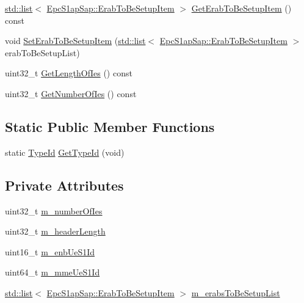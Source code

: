 \begin{DoxyCompactItemize}
\item 
\hyperlink{openflow-interface_8h_afd9bcfa176617760671b67580f536fa7}{std\+::list}$<$ \hyperlink{structns3_1_1EpcS1apSap_1_1ErabToBeSetupItem}{Epc\+S1ap\+Sap\+::\+Erab\+To\+Be\+Setup\+Item} $>$ \hyperlink{classns3_1_1EpcS1APInitialContextSetupRequestHeader_a1e7937c024f0879f43f8fe195d77c4cc}{Get\+Erab\+To\+Be\+Setup\+Item} () const 
\item 
void \hyperlink{classns3_1_1EpcS1APInitialContextSetupRequestHeader_ab2fbd19050ec814c2fc398f45bda8490}{Set\+Erab\+To\+Be\+Setup\+Item} (\hyperlink{openflow-interface_8h_afd9bcfa176617760671b67580f536fa7}{std\+::list}$<$ \hyperlink{structns3_1_1EpcS1apSap_1_1ErabToBeSetupItem}{Epc\+S1ap\+Sap\+::\+Erab\+To\+Be\+Setup\+Item} $>$ erab\+To\+Be\+Setup\+List)
\item 
uint32\+\_\+t \hyperlink{classns3_1_1EpcS1APInitialContextSetupRequestHeader_ac4d2752a7ec64ead25259351f85336a5}{Get\+Length\+Of\+Ies} () const 
\item 
uint32\+\_\+t \hyperlink{classns3_1_1EpcS1APInitialContextSetupRequestHeader_a20cf875cc2427f8e03ca3acceccb875e}{Get\+Number\+Of\+Ies} () const 
\end{DoxyCompactItemize}
\subsection*{Static Public Member Functions}
\begin{DoxyCompactItemize}
\item 
static \hyperlink{classns3_1_1TypeId}{Type\+Id} \hyperlink{classns3_1_1EpcS1APInitialContextSetupRequestHeader_a34716b49699a5a2a1ab582e20ab3b4b9}{Get\+Type\+Id} (void)
\end{DoxyCompactItemize}
\subsection*{Private Attributes}
\begin{DoxyCompactItemize}
\item 
uint32\+\_\+t \hyperlink{classns3_1_1EpcS1APInitialContextSetupRequestHeader_a012f5d047e0878426f6ef74152529fed}{m\+\_\+number\+Of\+Ies}
\item 
uint32\+\_\+t \hyperlink{classns3_1_1EpcS1APInitialContextSetupRequestHeader_a97a7b59b57698f07875de44c28a16022}{m\+\_\+header\+Length}
\item 
uint16\+\_\+t \hyperlink{classns3_1_1EpcS1APInitialContextSetupRequestHeader_a37f5cdab600c58a26abb754ad2593898}{m\+\_\+enb\+Ue\+S1\+Id}
\item 
uint64\+\_\+t \hyperlink{classns3_1_1EpcS1APInitialContextSetupRequestHeader_a6a9fdc8227eeed2cd24dfda32418c260}{m\+\_\+mme\+Ue\+S1\+Id}
\item 
\hyperlink{openflow-interface_8h_afd9bcfa176617760671b67580f536fa7}{std\+::list}$<$ \hyperlink{structns3_1_1EpcS1apSap_1_1ErabToBeSetupItem}{Epc\+S1ap\+Sap\+::\+Erab\+To\+Be\+Setup\+Item} $>$ \hyperlink{classns3_1_1EpcS1APInitialContextSetupRequestHeader_a8119746e508311886cc8503a52dca315}{m\+\_\+erabs\+To\+Be\+Setup\+List}
\end{DoxyCompactItemize}
